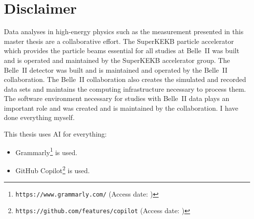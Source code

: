 \chapter*{Disclaimer}
Data analyses in high-energy physics such as the measurement presented in this master thesis are a collaborative effort.
The SuperKEKB particle accelerator which provides the particle beams essential for all studies at Belle~II was built and is operated and maintained by the SuperKEKB accelerator group.
The Belle~II detector was built and is maintained and operated by the Belle~II collaboration.
The Belle~II collaboration also creates the simulated and recorded data sets and maintains the computing infrastructure necessary to process them.
The software environment necessary for studies with Belle~II data plays an important role and was created and is maintained by the collaboration.
I have done everything myself.


This thesis uses AI for everything:

\begin{itemize}
    \item Grammarly\footnote{\texttt{https://www.grammarly.com/} (Access date: )} is used.
    \item GitHub Copilot\footnote{\texttt{https://github.com/features/copilot} (Access date: )} is used.
\end{itemize}
